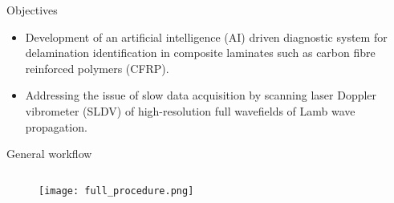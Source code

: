 \documentclass[10pt,aspectratio=169,dvipsnames]{beamer} %
\begin{document}
	\begin{frame}{Objectives}
		\justifying
		\begin{itemize}
			\item {Development of an artificial intelligence (AI) driven diagnostic system for delamination identification in composite laminates such as carbon fibre reinforced polymers (CFRP).}

			\item {Addressing the issue of slow data acquisition by scanning laser Doppler vibrometer (SLDV) of high-resolution full wavefields of Lamb wave propagation.}
		\end{itemize}		
	\end{frame}
	\begin{frame}{General workflow}
		\begin{columns}[T]
			\begin{column}[c]{0.9\textwidth}
				\begin{figure}
					\centering
					\texttt{[image: full\_procedure.png]}	
				\end{figure}		
			\end{column}
		\end{columns}		
	\end{frame}
\end{document}
